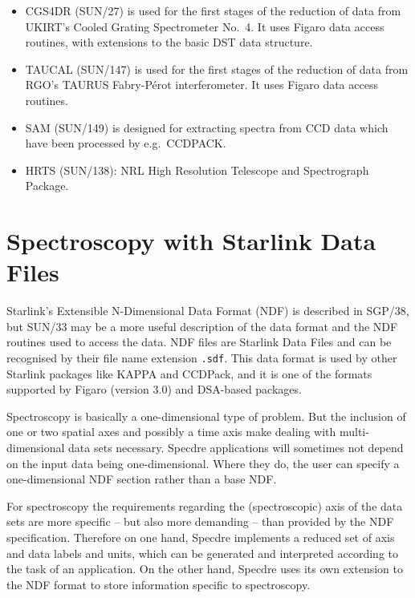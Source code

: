 \begin{itemize}
\item CGS4DR (SUN/27) is used for the first stages of the reduction of
   data from UKIRT's Cooled Grating Spectrometer No.\ 4. It uses Figaro
   data access routines, with extensions to the basic DST data
   structure.

\item TAUCAL (SUN/147) is used for the first stages of the reduction of
   data from RGO's TAURUS Fabry-P\'erot interferometer. It uses Figaro
   data access routines.

\item SAM (SUN/149) is designed for extracting spectra from CCD data
   which have been processed by e.g.\ CCDPACK.

\item HRTS (SUN/138): NRL High Resolution Telescope and Spectrograph
   Package.

\end{itemize}


\goodbreak
\section{Spectroscopy with Starlink Data Files}
\label{spandsdf}

Starlink's Extensible N-Dimensional Data Format (NDF) is described in SGP/38,
but SUN/33 may be a more useful description of the data format and the NDF
routines used to access the data. NDF files are Starlink Data Files and can be
recognised by their file name extension {\tt .sdf}. This data format is used by
other Starlink packages like KAPPA and CCDPack, and it is one of the formats
supported by Figaro (version 3.0) and DSA-based packages.

Spectroscopy is basically a one-dimensional type of problem. But the inclusion
of one or two spatial axes and possibly a time axis make dealing with
multi-dimensional data sets necessary. Specdre applications will sometimes
not depend on the input data being one-dimensional. Where they do, the user can
specify a one-dimensional NDF section rather than a base NDF.

For spectroscopy the requirements regarding the (spectroscopic) axis of the
data sets are more specific -- but also more demanding -- than provided by the
NDF specification. Therefore on one hand, Specdre implements a reduced set of
axis and data labels and units, which can be generated and interpreted
according to the task of an application. On the other hand, Specdre uses its
own extension to the NDF format to store information specific to spectroscopy.



